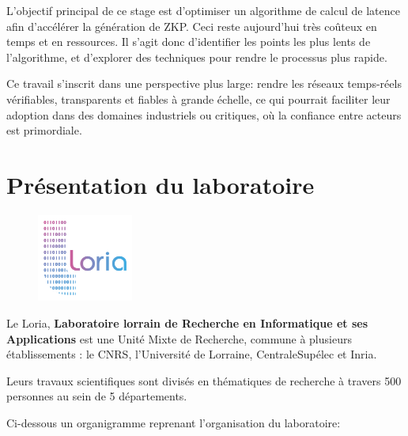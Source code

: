 \documentclass[12pt]{report}
\begin{document}
\bigskip

L'objectif principal de ce stage est d'optimiser un algorithme de calcul de latence 
afin d'accélérer la génération de ZKP. Ceci reste aujourd'hui 
très coûteux en temps et en ressources. Il s'agit donc d'identifier les 
points les plus lents de l'algorithme, et d'explorer des techniques pour rendre le
processus plus rapide.

\bigskip

Ce travail s'inscrit dans une perspective plus large: rendre les 
réseaux temps-réels vérifiables, transparents et fiables à grande échelle, 
ce qui pourrait faciliter leur adoption dans des domaines industriels ou 
critiques, où la confiance entre acteurs est primordiale.

\section*{Présentation du laboratoire}

\begin{figure}
    \vspace{-10pt}
    \includegraphics[width=0.28\textwidth]{logo_loria.png}
    \vspace{-10pt}
\end{figure}

Le Loria, \textbf{Laboratoire lorrain de Recherche en Informatique et 
ses Applications} est une Unité Mixte de Recherche, commune à plusieurs 
établissements : le CNRS, l'Université de Lorraine, CentraleSupélec et 
Inria.

Leurs travaux scientifiques sont divisés en thématiques de recherche à travers 
500 personnes au sein de 5 départements.

\medskip

Ci-dessous un organigramme reprenant l'organisation du laboratoire:

\vspace{1cm}  
\end{document}
